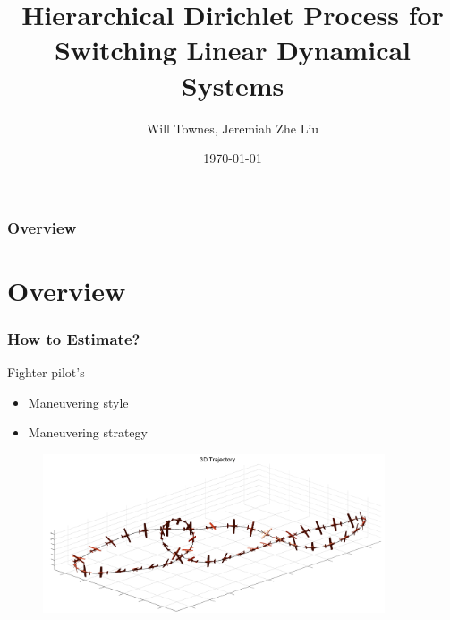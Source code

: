 \documentclass{beamer}
\title[HDP-HMM-SLDS]{Hierarchical Dirichlet Process for Switching Linear Dynamical Systems} %
\author{Will Townes, Jeremiah Zhe Liu} %
\date{\today} %
\begin{document}
\begin{frame}
\titlepage %
\end{frame}

\begin{frame}
\frametitle{Overview} %
\tableofcontents %
\end{frame}


\section{Overview}
\begin{frame}
\frametitle{How to Estimate?}
Fighter pilot's
\begin{itemize}
\item Maneuvering style
\item Maneuvering strategy
\end{itemize}

\begin{figure}
\includegraphics[width=0.9\textwidth]{"./plot/trajectory"}
\end{figure}
\end{frame}
\end{document}
